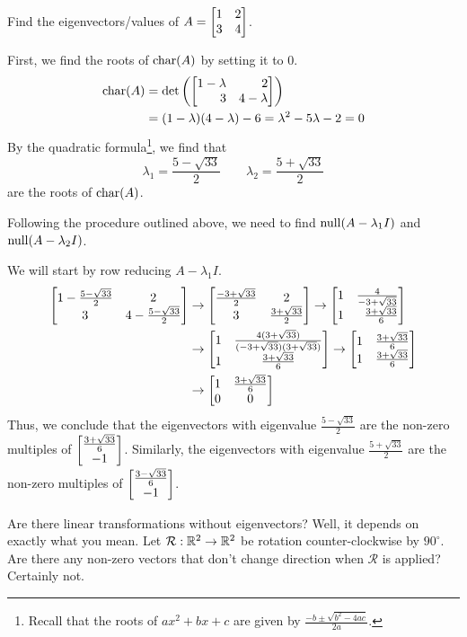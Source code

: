 \begin{example}
	Find the eigenvectors/values of $A=\mat{1&2\\3&4}$.

	First, we find the roots of $\operatorname{char}(A)$ by setting it to $0$.
	\begin{align*}
	    \Char(A)&=\det\left(\mat{1-\lambda&2\\3&4-\lambda}\right)\\
	            &=(1-\lambda)(4-\lambda)-6=\lambda^2-5\lambda-2=0
	\end{align*}
	By the quadratic formula\footnote{ Recall that the
	roots of $ax^2+bx+c$ are given by $\frac{-b\pm\sqrt{b^2-4ac}}{2a}$.}, we find that
	\[\lambda_1=\frac{5-\sqrt{33}}{2}\qquad\lambda_2=\frac{5+\sqrt{33}}{2}\]
	are the roots of $\operatorname{char}(A)$.
	
	
	Following the procedure outlined above, we need to
	find $\operatorname{null}(A-\lambda_1I)$ and $\operatorname{null}(A-\lambda_2I)$.
	
	We will start by row reducing $A-\lambda_1I$.
	\begin{align*}
	    \matc{1-\frac{5-\sqrt{33}}{2}&2\\3&4-\frac{5-\sqrt{33}}{2}} & \to
	    \matc{\frac{-3+\sqrt{33}}{2}&2\\3&\frac{3+\sqrt{33}}{2}} \to \mat{1&\frac{4}{-3+\sqrt{33}}\\1&\frac{3+\sqrt{33}}{6}}\\
	    & \to \matc{1&\frac{4(3+\sqrt{33})}{(-3+\sqrt{33})(3+\sqrt{33})}\\1&\frac{3+\sqrt{33}}{6}} \to \mat{1&\frac{3+\sqrt{33}}{6}\\1&\frac{3+\sqrt{33}}{6}}\\
	    & \to \matc{1&\frac{3+\sqrt{33}}{6}\\0&0}
	\end{align*}
	Thus, we conclude that the eigenvectors with eigenvalue $\frac{5-\sqrt{33}}{2}$ are the non-zero multiples of 
	$\begin{bmatrix}\frac{3+\sqrt{33}}{6}\\-1\end{bmatrix}$. 
	Similarly, the eigenvectors with eigenvalue $\frac{5+\sqrt{33}}{2}$ 
	are the non-zero multiples of $\begin{bmatrix}\frac{3-\sqrt{33}}{6}\\-1\end{bmatrix}$.
\end{example}


Are there linear transformations without eigenvectors? Well, it
depends on exactly what you mean. Let $\mathcal R:\mathbb{R}^2\to\mathbb{R}^2$
be rotation counter-clockwise by $90^\circ$. Are there any non-zero
vectors that don't change direction when $\mathcal R$ is applied?
Certainly not.

